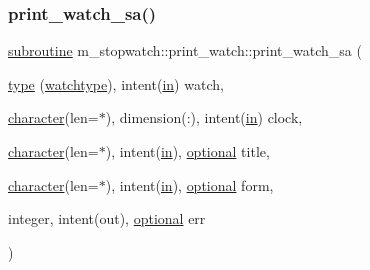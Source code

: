 \subsubsection{\texorpdfstring{print\+\_\+watch\+\_\+sa()}{print\_watch\_sa()}}
{\footnotesize\ttfamily \hyperlink{M__stopwatch_83_8txt_acfbcff50169d691ff02d4a123ed70482}{subroutine} m\+\_\+stopwatch\+::print\+\_\+watch\+::print\+\_\+watch\+\_\+sa (\begin{DoxyParamCaption}\item[{\hyperlink{stop__watch_83_8txt_a70f0ead91c32e25323c03265aa302c1c}{type} (\hyperlink{structm__stopwatch_1_1watchtype}{watchtype}), intent(\hyperlink{M__journal_83_8txt_afce72651d1eed785a2132bee863b2f38}{in})}]{watch,  }\item[{\hyperlink{option__stopwatch_83_8txt_abd4b21fbbd175834027b5224bfe97e66}{character}(len=$\ast$), dimension(\+:), intent(\hyperlink{M__journal_83_8txt_afce72651d1eed785a2132bee863b2f38}{in})}]{clock,  }\item[{\hyperlink{option__stopwatch_83_8txt_abd4b21fbbd175834027b5224bfe97e66}{character}(len=$\ast$), intent(\hyperlink{M__journal_83_8txt_afce72651d1eed785a2132bee863b2f38}{in}), \hyperlink{option__stopwatch_83_8txt_aa4ece75e7acf58a4843f70fe18c3ade5}{optional}}]{title,  }\item[{\hyperlink{option__stopwatch_83_8txt_abd4b21fbbd175834027b5224bfe97e66}{character}(len=$\ast$), intent(\hyperlink{M__journal_83_8txt_afce72651d1eed785a2132bee863b2f38}{in}), \hyperlink{option__stopwatch_83_8txt_aa4ece75e7acf58a4843f70fe18c3ade5}{optional}}]{form,  }\item[{integer, intent(out), \hyperlink{option__stopwatch_83_8txt_aa4ece75e7acf58a4843f70fe18c3ade5}{optional}}]{err }\end{DoxyParamCaption})\hspace{0.3cm}{\ttfamily [private]}}

\mbox{\label{interfacem__stopwatch_1_1print__watch_a66651adceb215ea8b6bc111facc14a35}} 
